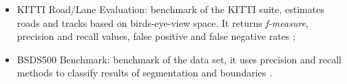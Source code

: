\begin{itemize}
 \item KITTI Road/Lane Evaluation: benchmark of the KITTI suite, estimates roads and tracks based on birds-eye-view space. It returns \textit{f-measure}, precision and recall values, false positive and false negative rates \cite{Fritsch2013ITSC};
 
 \item BSDS500 Benchmark: benchmark of the data set, it uses precision and recall methods to classify results of segmentation and boundaries \cite{amfm_pami2011}.
 
\end{itemize}

% 
% 
%  
%  
%  
%  

